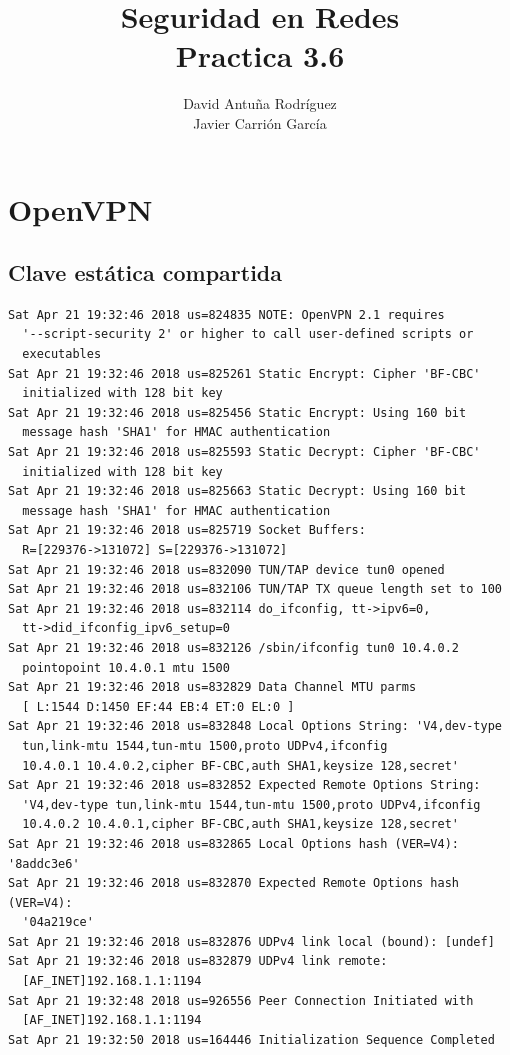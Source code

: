 \documentclass[11pt]{article}
\title{\Large Seguridad en Redes\\Practica 3.6}
\author{David Antuña Rodríguez\\Javier Carrión García}
\date{}
\begin{document}
  \raggedright

  \maketitle
  \newpage

  \section{OpenVPN}
    \subsection{Clave estática compartida}
      \lstset{basicstyle=\ttfamily\small}
\begin{lstlisting}
Sat Apr 21 19:32:46 2018 us=824835 NOTE: OpenVPN 2.1 requires
  '--script-security 2' or higher to call user-defined scripts or
  executables
Sat Apr 21 19:32:46 2018 us=825261 Static Encrypt: Cipher 'BF-CBC'
  initialized with 128 bit key
Sat Apr 21 19:32:46 2018 us=825456 Static Encrypt: Using 160 bit
  message hash 'SHA1' for HMAC authentication
Sat Apr 21 19:32:46 2018 us=825593 Static Decrypt: Cipher 'BF-CBC'
  initialized with 128 bit key
Sat Apr 21 19:32:46 2018 us=825663 Static Decrypt: Using 160 bit
  message hash 'SHA1' for HMAC authentication
Sat Apr 21 19:32:46 2018 us=825719 Socket Buffers:
  R=[229376->131072] S=[229376->131072]
Sat Apr 21 19:32:46 2018 us=832090 TUN/TAP device tun0 opened
Sat Apr 21 19:32:46 2018 us=832106 TUN/TAP TX queue length set to 100
Sat Apr 21 19:32:46 2018 us=832114 do_ifconfig, tt->ipv6=0,
  tt->did_ifconfig_ipv6_setup=0
Sat Apr 21 19:32:46 2018 us=832126 /sbin/ifconfig tun0 10.4.0.2
  pointopoint 10.4.0.1 mtu 1500
Sat Apr 21 19:32:46 2018 us=832829 Data Channel MTU parms
  [ L:1544 D:1450 EF:44 EB:4 ET:0 EL:0 ]
Sat Apr 21 19:32:46 2018 us=832848 Local Options String: 'V4,dev-type
  tun,link-mtu 1544,tun-mtu 1500,proto UDPv4,ifconfig
  10.4.0.1 10.4.0.2,cipher BF-CBC,auth SHA1,keysize 128,secret'
Sat Apr 21 19:32:46 2018 us=832852 Expected Remote Options String:
  'V4,dev-type tun,link-mtu 1544,tun-mtu 1500,proto UDPv4,ifconfig
  10.4.0.2 10.4.0.1,cipher BF-CBC,auth SHA1,keysize 128,secret'
Sat Apr 21 19:32:46 2018 us=832865 Local Options hash (VER=V4): '8addc3e6'
Sat Apr 21 19:32:46 2018 us=832870 Expected Remote Options hash (VER=V4):
  '04a219ce'
Sat Apr 21 19:32:46 2018 us=832876 UDPv4 link local (bound): [undef]
Sat Apr 21 19:32:46 2018 us=832879 UDPv4 link remote:
  [AF_INET]192.168.1.1:1194
Sat Apr 21 19:32:48 2018 us=926556 Peer Connection Initiated with
  [AF_INET]192.168.1.1:1194
Sat Apr 21 19:32:50 2018 us=164446 Initialization Sequence Completed
\end{lstlisting}
\end{document}
